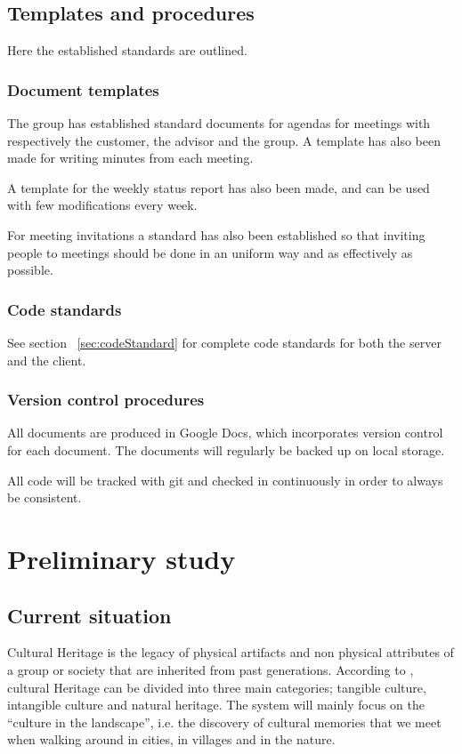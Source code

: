 \documentclass[11pt]{book}
\begin{document}
\section{Templates and procedures}
Here the established standards are outlined.

\subsection{Document templates}
The group has established standard documents for agendas for meetings with respectively the customer, the advisor and the group. A template has also been made for writing minutes from each meeting.

A template for the weekly status report has also been made, and can be used with few modifications every week.

For meeting invitations a standard has also been established so that inviting people to meetings should be done in an uniform way and as effectively as possible.

\subsection{Code standards}
See section ~\ref{sec:codeStandard} for complete code standards for both the server and the client.

\subsection{Version control procedures}
All documents are produced in Google Docs, which incorporates version control for each document. The documents will regularly be backed up on local storage.

All code will be tracked with git and checked in continuously in order to always be consistent.

\chapter{Preliminary study}

\section{Current situation}
Cultural Heritage is the legacy of physical artifacts and non physical attributes of a group or society that are inherited from past generations. According to \cite{CiD:culturalheritage}, cultural Heritage can be divided into three main categories; tangible culture, intangible culture and natural heritage. The system will mainly focus on the ``culture in the landscape'', i.e. the discovery of cultural memories that we meet when walking around in cities, in villages and in the nature.
\end{document}
